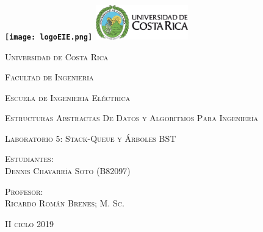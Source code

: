 \documentclass[11pt]{article}
\begin{document}
\sloppy%


\renewcommand{\refname}{}

\nocite{*} %

\begin{titlepage}
		\bf
		\centering
		\texttt{[image: logoEIE.png]}			
		\hspace{7cm} 
		\includegraphics[width=0.30\textwidth]{logoUCR.png}	
		\par
		\vspace{2cm}			
		{\scshape\large Universidad de Costa Rica \par}
		\vspace{0.6cm}
		{\scshape\large Facultad de Ingenieria\par}
		\vspace{0.6cm}
		{\scshape\large Escuela de Ingenieria Eléctrica\par}
		\vspace{0.6cm}
		{\scshape\large Estructuras Abstractas De Datos y Algoritmos Para Ingeniería   \par}
		\vspace{1.5cm}		
		{\scshape\large Laboratorio 5: Stack-Queue y Árboles BST\par}
		\vspace{2.5cm}		
		{\scshape\large Estudiantes:\\ Dennis Chavarría Soto (B82097)  \par}
		\vspace{2.5cm}		
		{\scshape\large Profesor:\\ Ricardo Román Brenes; M. Sc. \par}
		\vspace{2.5cm}
		{\scshape\large II ciclo 2019 \par}
\end{titlepage}
\end{document}
